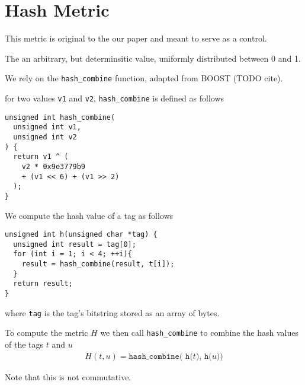 \section{Hash Metric} \label{sec:hashmetric}

This metric is original to the our paper and meant to serve as a control.

The an arbitrary, but determinsitic value, uniformly distributed between 0 and 1.

We rely on the \texttt{hash\_combine} function, adapted from BOOST (TODO cite).

for two values \texttt{v1} and \texttt{v2}, \texttt{hash\_combine} is defined as follows
\begin{verbatim}
unsigned int hash_combine(
  unsigned int v1,
  unsigned int v2
) {
  return v1 ^ (
    v2 * 0x9e3779b9
    + (v1 << 6) + (v1 >> 2)
  );
}
\end{verbatim}

We compute the hash value of a tag as follows
\begin{verbatim}
unsigned int h(unsigned char *tag) {
  unsigned int result = tag[0];
  for (int i = 1; i < 4; ++i){
    result = hash_combine(result, t[i]);
  }
  return result;
}
\end{verbatim}
where \texttt{tag} is the tag's bitstring stored as an array of bytes.

To compute the metric $H$ we then call \texttt{hash\_combine} to combine the hash values of the tags $t$ and $u$
\begin{align*}
H(t, u) = \texttt{hash\_combine( h(}t\texttt{), h(}u\texttt{))}
\end{align*}

Note that this is not commutative.


